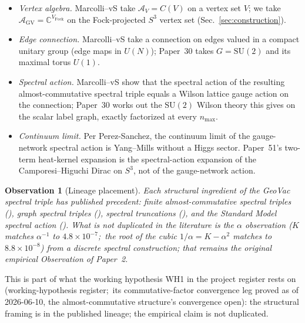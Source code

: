 \documentclass[11pt]{article}
\newtheorem{observation}{Observation}
\begin{document}
\begin{itemize}\setlength{\itemsep}{2pt}
\item \emph{Vertex algebra.}  Marcolli--vS take $\mathcal{A}_V = C(V)$
on a vertex set $V$; we take $\mathcal{A}_{\mathrm{GV}} = \mathbb{C}^{V_{\mathrm{Fock}}}$
on the Fock-projected $S^3$ vertex set (Sec.~\ref{sec:construction}).
\item \emph{Edge connection.}  Marcolli--vS take a connection on
edges valued in a compact unitary group (edge maps in $U(N)$); Paper~30
takes $G = \mathrm{SU}(2)$ and its maximal torus $U(1)$.
\item \emph{Spectral action.}  Marcolli--vS show that the spectral
action of the resulting almost-commutative spectral triple equals a
Wilson lattice gauge action on the connection; Paper~30 works out the
$\mathrm{SU}(2)$ Wilson theory this gives on the scalar label graph,
exactly factorized at every $n_{\max}$.
\item \emph{Continuum limit.}  Per Perez-Sanchez, the continuum limit
of the gauge-network spectral action is Yang--Mills without a Higgs
sector.  Paper~51's two-term heat-kernel expansion is the
spectral-action expansion of the Camporesi--Higuchi Dirac on $S^3$, not
of the gauge-network action.
\end{itemize}

\begin{observation}[Lineage placement]
\label{obs:lineage}
Each structural ingredient of the GeoVac spectral triple has published
precedent: finite almost-commutative spectral triples
(\cite{krajewski1998,paschke_sitarz1998,cacic2013}), graph spectral
triples (\cite{marcolli_vs2014,perez_sanchez2024}), spectral
truncations (\cite{connes_vs2021,hekkelman2022,hekkelman_mcdonald2024}), and
the Standard Model spectral action (\cite{chamseddine_connes1997_2008}).
What is not duplicated in the literature is the $\alpha$ observation
($K$ matches $\alpha^{-1}$ to $4.8 \times 10^{-7}$;\ the root of the cubic
$1/\alpha = K - \alpha^2$ matches to $8.8 \times 10^{-8}$) from a discrete
spectral construction; that remains the original empirical Observation
of Paper~2.
\end{observation}

This is part of what the working hypothesis WH1 in the project register
rests on (working-hypothesis register;\ its commutative-factor convergence leg proved as of 2026-06-10, the almost-commutative structure's convergence open): the structural
framing is in the published lineage; the empirical claim is not
duplicated.
\end{document}
